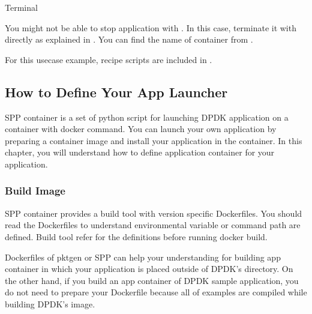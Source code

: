 \documentclass[a4paper,11pt,openany,oneside,english]{sphinxmanual}
\begin{document}
\begin{sphinxVerbatim}[commandchars=\\\{\},formatcom=\footnotesize]
 Terminal 
\end{sphinxVerbatim}

You might not be able to stop  application with .
In this case, terminate it with  directly as explained in
{\hyperref[\detokenize{tools/sppc/app_launcher:sppc-appl-load-balancer}]{}}.
You can find the name of container from .

For this usecase example, recipe scripts are included in
.


\subsection{How to Define Your App Launcher}
\label{\detokenize{tools/sppc/howto_launcher:how-to-define-your-app-launcher}}\label{\detokenize{tools/sppc/howto_launcher:sppc-howto-define-appc}}\label{\detokenize{tools/sppc/howto_launcher::doc}}
SPP container is a set of python script for launching DPDK application
on a container with docker command. You can launch your own application
by preparing a container image and install your application in
the container.
In this chapter, you will understand how to define application container
for your application.


\subsubsection{Build Image}
\label{\detokenize{tools/sppc/howto_launcher:build-image}}\label{\detokenize{tools/sppc/howto_launcher:sppc-howto-build-img}}
SPP container provides a build tool with version specific Dockerfiles.
You should read the Dockerfiles to understand environmental variable
or command path are defined.
Build tool refer  for the definitions before running
docker build.

Dockerfiles of pktgen or SPP can help your understanding for building
app container in which your application is placed outside of DPDK’s
directory.
On the other hand, if you build an app container of DPDK sample
application, you do not need to prepare your Dockerfile because all of
examples are compiled while building DPDK’s image.
\end{document}

